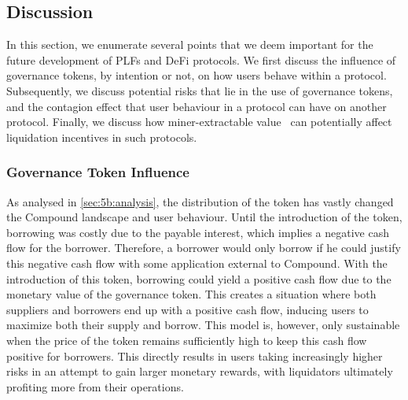 \subsection{Discussion}
\label{sec:5b:discussion}
In this section, we enumerate several points that we deem important for the future development of PLFs and DeFi protocols.
We first discuss the influence of governance tokens, by intention or not, on how users behave within a protocol.
Subsequently, we discuss potential risks that lie in the use of governance tokens, and the contagion effect that user behaviour in a protocol can have on another protocol.
Finally, we discuss how miner-extractable value~\cite{daian2020flash} can potentially affect liquidation incentives in such protocols.

\subsubsection{Governance Token Influence}
As analysed in \autoref{sec:5b:analysis}, the distribution of the  token has vastly changed the Compound landscape and user behaviour.
Until the introduction of the token, borrowing was costly due to the payable interest, which implies a negative cash flow for the borrower. Therefore, a borrower would only borrow if he could justify this negative cash flow with some application external to Compound.
With the introduction of this token, borrowing could yield a positive cash flow due to the monetary value of the governance token.
This creates a situation where both suppliers and borrowers end up with a positive cash flow, inducing users to maximize both their supply and borrow.
This model is, however, only sustainable when the price of the  token remains sufficiently high to keep this cash flow positive for borrowers.
This directly results in users taking increasingly higher risks in an attempt to gain larger monetary rewards, with liquidators ultimately profiting more from their operations.

